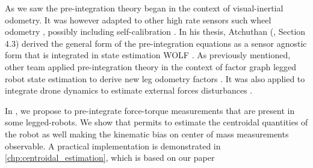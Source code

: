 As we saw the pre-integration theory began in the context of visual-inertial odometry. It was however adapted to other high rate sensors such wheel odometry \cite{quan2019tightly}, 
possibly including self-calibration \cite{deray-19-selfcalib}. In his thesis, Atchuthan (\cite{atchuthan-18-thesis}, Section 4.3) derived the general form of the pre-integration 
equations as a sensor agnostic form that is integrated in state estimation WOLF \cite{sola2021wolf}. As previously mentioned, other team applied pre-integration theory in the 
context of factor graph legged robot state estimation to derive new leg odometry factors \cite{hartley2018legged, wisth2019robust, wisth2020pre-integrated}.
It was also applied to integrate drone dynamics to estimate external forces disturbances \cite{nisar2019vimo}.

In , we propose to pre-integrate force-torque measurements that are present in some legged-robots. We show that permits to estimate the centroidal quantities of the robot as well making the kinematic bias on center of mass measurements observable. A practical implementation is demonstrated in \ref{chp:centroidal_estimation}, which is based on our paper \cite{fourmy2021contact}

